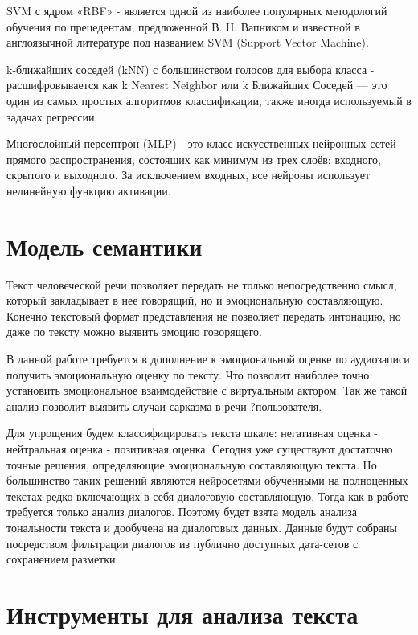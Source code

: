SVM с ядром «RBF» -  является одной из наиболее популярных методологий обучения по прецедентам,
предложенной В. Н. Вапником и известной в англоязычной литературе под названием SVM (Support Vector Machine).

k-ближайших соседей (kNN) с большинством голосов для выбора класса - 
расшифровывается как k Nearest Neighbor или k Ближайших Соседей — это один из самых простых алгоритмов классификации, также иногда используемый в задачах регрессии. 

Многослойный персептрон (MLP) -  это класс искусственных нейронных сетей прямого распространения, состоящих как минимум из трех слоёв: входного, скрытого и выходного.
За исключением входных, все нейроны использует нелинейную функцию активации.


\section{Модель семантики}

Текст человеческой речи позволяет передать не только непосредственно смысл, который закладывает в нее говорящий,
но и эмоциональную составляющую. Конечно текстовый формат представления не позволяет передать интонацию, но
даже по тексту можно выявить эмоцию говорящего.

В данной работе требуется в дополнение к эмоциональной оценке по аудиозаписи получить эмоциональную оценку
по тексту. Что позволит наиболее точно установить эмоциональное взаимодействие с виртуальным актором.
Так же такой анализ позволит выявить случаи сарказма в речи ?пользователя.

Для упрощения будем классифицировать текста шкале:
негативная оценка - нейтральная оценка - позитивная оценка.
Сегодня уже существуют достаточно точные решения, определяющие эмоциональную составляющую текста.
Но большинство таких решений являются нейросетями обученными на полноценных текстах редко включающих в себя
диалоговую составляющую. Тогда как в работе требуется только анализ диалогов. Поэтому
будет взята модель анализа тональности текста и дообучена на диалоговых данных.
Данные будут собраны посредством фильтрации диалогов из публично доступных дата-сетов с сохранением разметки.

\section{Инструменты для анализа текста}

